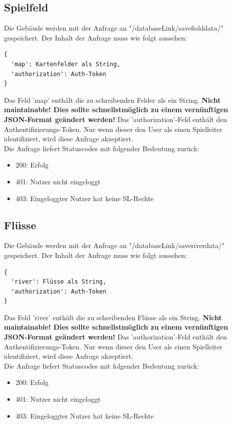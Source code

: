 \documentclass[11pt,a4paper,twocolumn]{article}
\begin{document}
\subsection{Spielfeld}\label{ss:write_fields}
Die Gebäude werden mit der Anfrage an "/databaseLink/savefielddata/" gespeichert. Der Inhalt der Anfrage muss wie folgt aussehen:
\begin{lstlisting}
{
  'map': Kartenfelder als String,
  'authorization': Auth-Token
}
\end{lstlisting}
Das Feld 'map' enthält die zu schreibenden Felder als ein String. \textbf{ Nicht maintainable! Dies sollte schnellstmöglich zu einem vernünftigen JSON-Format geändert werden!} Das 'authorization'-Feld enthält den Authentifizierungs-Token. Nur wenn dieser den User als einen Spielleiter identifiziert, wird diese Anfrage akzeptiert.\\
Die Anfrage liefert Statuscodes mit folgender Bedeutung zurück:
\begin{itemize}
\item 200: Erfolg
\item 401: Nutzer nicht eingeloggt
\item 403: Eingeloggter Nutzer hat keine SL-Rechte
\end{itemize}
\subsection{Flüsse}\label{ss:write_rivers}
Die Gebäude werden mit der Anfrage an "/databaseLink/saveriverdata/" gespeichert. Der Inhalt der Anfrage muss wie folgt aussehen:
\begin{lstlisting}
{
  'river': Flüsse als String,
  'authorization': Auth-Token
}
\end{lstlisting}
Das Feld 'river' enthält die zu schreibenden Flüsse als ein String. \textbf{ Nicht maintainable! Dies sollte schnellstmöglich zu einem vernünftigen JSON-Format geändert werden!} Das 'authorization'-Feld enthält den Authentifizierungs-Token. Nur wenn dieser den User als einen Spielleiter identifiziert, wird diese Anfrage akzeptiert.\\
Die Anfrage liefert Statuscodes mit folgender Bedeutung zurück:
\begin{itemize}
\item 200: Erfolg
\item 401: Nutzer nicht eingeloggt
\item 403: Eingeloggter Nutzer hat keine SL-Rechte
\end{itemize}
\end{document}
